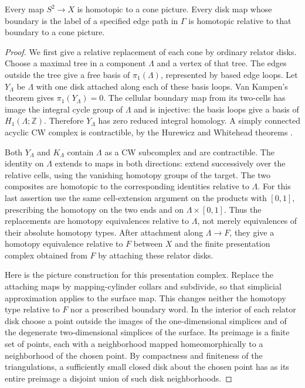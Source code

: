 \begin{lemma}\label{lem:cone-pictures}
Every map $S^2\to X$ is homotopic to a cone picture.  Every disk map
whose boundary is the label of a specified edge path in $\Gamma$ is
homotopic relative to that boundary to a cone picture.
\end{lemma}

\begin{proof}
We first give a relative replacement of each cone by ordinary relator
disks.  Choose a maximal tree in a component $\Lambda$ and a vertex of
that tree.  The edges outside the tree give a free basis of
$\pi_1(\Lambda)$, represented by based edge loops.  Let $Y_\Lambda$
be $\Lambda$ with one disk attached along each of these basis loops.
Van Kampen's theorem gives $\pi_1(Y_\Lambda)=0$.  The cellular boundary
map from its two-cells has image the integral cycle group of $\Lambda$
and is injective: the basis loops give a basis of
$H_1(\Lambda;\mathbb Z)$.  Therefore $Y_\Lambda$ has zero reduced
integral homology.  A simply connected acyclic CW complex is
contractible, by the Hurewicz and Whitehead theorems
\cite[Sections 4.1 and 4.2]{Hatcher2002}.

Both $Y_\Lambda$ and $K_\Lambda$ contain $\Lambda$ as a CW subcomplex
and are contractible.  The identity on $\Lambda$ extends to maps in
both directions: extend successively over the relative cells, using
the vanishing homotopy groups of the target.  The two composites are
homotopic to the corresponding identities relative to $\Lambda$.
For this last assertion use the same cell-extension argument on the
products with $[0,1]$, prescribing the homotopy on the two ends and on
$\Lambda\times[0,1]$.  Thus the replacements are homotopy equivalences
relative to $\Lambda$, not merely equivalences of their absolute
homotopy types.  After attachment along $\Lambda\to F$, they give a
homotopy equivalence relative to $F$ between $X$ and the finite
presentation complex obtained from $F$ by attaching these relator
disks.

Here is the picture construction for this presentation complex.
Replace the attaching maps by mapping-cylinder collars and subdivide,
so that simplicial approximation applies to the surface map.  This
changes neither the homotopy type relative to $F$ nor a prescribed
boundary word.  In the interior of each relator disk choose a point
outside the images of the one-dimensional simplices and of the
degenerate two-dimensional simplices of the surface.  Its preimage is
a finite set of points, each with a neighborhood mapped
homeomorphically to a neighborhood of the chosen point.  By compactness
and finiteness of the triangulations, a sufficiently small closed disk
about the chosen point has as its entire preimage a disjoint union of
such disk neighborhoods.


\end{proof}
